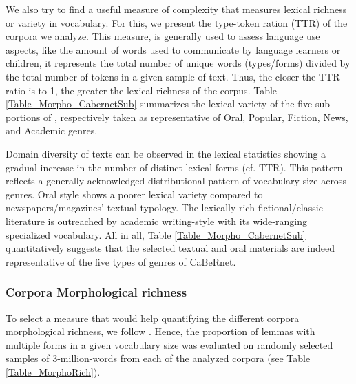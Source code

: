 We also try to find a useful measure of complexity that measures lexical richness or variety in vocabulary. For this, we present the type-token ration (TTR) of the corpora we analyze. This measure, is generally used to assess language use aspects, like the amount of words used to communicate by language learners or children, it represents the total number of unique words (types/forms) divided by the total number of tokens in a given sample of text. Thus, the closer the TTR ratio is to 1, the greater the lexical richness of the corpus. Table \ref{Table_Morpho_CabernetSub} summarizes the lexical variety of the five sub-portions of \Cabernet, respectively taken as representative of Oral, Popular, Fiction, News, and Academic genres. 

Domain diversity of texts can be observed in the lexical statistics showing a gradual increase in the number of distinct lexical forms (cf. TTR). This pattern  reflects a generally acknowledged distributional pattern of vocabulary-size across genres. Oral style shows a poorer lexical variety compared to newspapers/magazines’ textual typology. The lexically rich fictional/classic literature is outreached by academic writing-style with its wide-ranging specialized vocabulary. All in all, Table \ref{Table_Morpho_CabernetSub} quantitatively suggests that the selected textual and oral materials are indeed representative of the five types of genres of CaBeRnet.

\subsubsection{Corpora Morphological richness}

To select a measure that would help quantifying the different corpora morphological richness, we follow \citep{bonami-etal-2015-implicative}. Hence, the proportion of lemmas with multiple forms in a given vocabulary size was evaluated on randomly selected samples of 3-million-words from each of the analyzed corpora (see Table \ref{Table_MorphoRich}).

